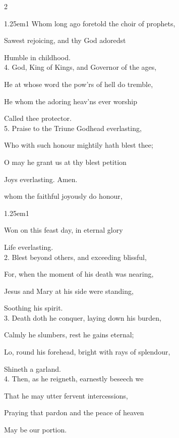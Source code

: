 \begin{paracol}{2}
\begin{hangparas}{1.25em}{1}
Whom long ago foretold the choir of prophets,

Sawest rejoicing, and thy God adoredst

Humble in childhood.\\

4. God, King of Kings, and Governor of the ages,

He at whose word the pow'rs of hell do tremble,

He whom the adoring heav'ns ever worship

Called thee protector.\\

5. Praise to the Triune Godhead everlasting,

Who with such honour mightily hath blest thee;

O may he grant us at thy blest petition

Joys everlasting. Amen.
\end{hangparas}
	

\mattinsOfficeHymn\label{JosephMattins}
	
 whom the faithful joyously do honour,

\begin{hangparas}{1.25em}{1}

Won on this feast day, in eternal glory

Life everlasting.\\

2. Blest beyond others, and exceeding blissful,

For, when the moment of his death was nearing,

Jesus and Mary at his side were standing,

Soothing his spirit.\\

3. Death doth he conquer, laying down his burden,

Calmly he slumbers, rest he gains eternal;

Lo, round his forehead, bright with rays of splendour,

Shineth a garland.\\

4. Then, as he reigneth, earnestly beseech we

That he may utter fervent intercessions,

Praying that pardon and the peace of heaven

May be our portion.\\


\end{hangparas}
\end{paracol}
